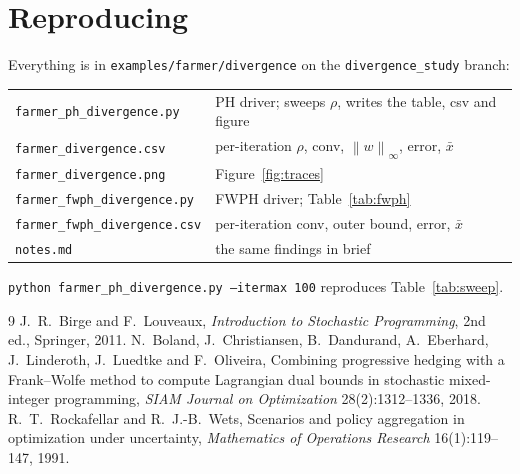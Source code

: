 \documentclass[11pt]{article}
\newcommand{\norm}[1]{\left\lVert #1 \right\rVert}
\newcommand{\xbar}{\bar{x}}
\begin{document}
\section{Reproducing}

Everything is in \texttt{examples/farmer/divergence} on the
\texttt{divergence\_study} branch:

\begin{center}
\begin{tabular}{ll}
\toprule
\texttt{farmer\_ph\_divergence.py}   & PH driver; sweeps $\rho$, writes the table, csv and figure \\
\texttt{farmer\_divergence.csv}      & per-iteration $\rho$, conv, $\norm{w}_\infty$, error, $\xbar$ \\
\texttt{farmer\_divergence.png}      & Figure~\ref{fig:traces} \\
\texttt{farmer\_fwph\_divergence.py} & FWPH driver; Table~\ref{tab:fwph} \\
\texttt{farmer\_fwph\_divergence.csv}& per-iteration conv, outer bound, error, $\xbar$ \\
\texttt{notes.md}                    & the same findings in brief \\
\bottomrule
\end{tabular}
\end{center}

\noindent
\texttt{python farmer\_ph\_divergence.py --itermax 100} reproduces
Table~\ref{tab:sweep}.

\begin{thebibliography}{9}
 J.\ R.\ Birge and F.\ Louveaux,
  \emph{Introduction to Stochastic Programming}, 2nd ed., Springer, 2011.
 N.\ Boland, J.\ Christiansen, B.\ Dandurand, A.\ Eberhard,
  J.\ Linderoth, J.\ Luedtke and F.\ Oliveira,
  Combining progressive hedging with a Frank--Wolfe method to compute Lagrangian
  dual bounds in stochastic mixed-integer programming,
  \emph{SIAM Journal on Optimization} 28(2):1312--1336, 2018.
 R.\ T.\ Rockafellar and R.\ J.-B.\ Wets,
  Scenarios and policy aggregation in optimization under uncertainty,
  \emph{Mathematics of Operations Research} 16(1):119--147, 1991.
\end{thebibliography}
\end{document}
